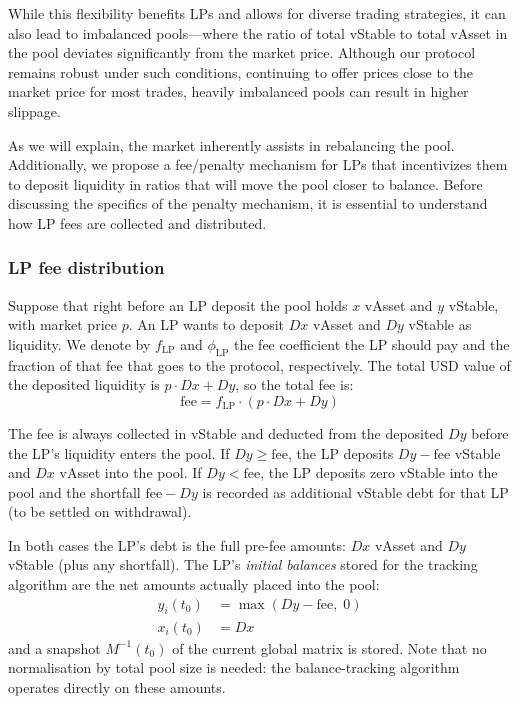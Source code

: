 \documentclass{article}
\begin{document}
While this flexibility benefits LPs and allows for diverse trading strategies, it can also
lead to imbalanced pools---where the ratio of total vStable to total vAsset in the pool
deviates significantly from the market price. Although our protocol remains robust under
such conditions, continuing to offer prices close to the market price for most trades,
heavily imbalanced pools can result in higher slippage.

As we will explain, the market inherently assists in rebalancing the pool. Additionally, we
propose a fee/penalty mechanism for LPs that incentivizes them to deposit liquidity in
ratios that will move the pool closer to balance. Before discussing the specifics of the
penalty mechanism, it is essential to understand how LP fees are collected and distributed.

\subsubsection{LP fee distribution}

Suppose that right before an LP deposit the pool holds $x$ vAsset and $y$ vStable, with
market price $p$. An LP wants to deposit $Dx$ vAsset and $Dy$ vStable as liquidity. We
denote by $f_{\mathrm{LP}}$ and $\phi_{\mathrm{LP}}$ the fee coefficient the LP should pay
and the fraction of that fee that goes to the protocol, respectively. The total USD value of
the deposited liquidity is $p \cdot Dx + Dy$, so the total fee is:
\begin{equation}
\mathrm{fee} = f_{\mathrm{LP}} \cdot (p \cdot Dx + Dy)
\end{equation}

The fee is always collected in vStable and deducted from the deposited $Dy$ before the
LP's liquidity enters the pool. If $Dy \geq \mathrm{fee}$, the LP deposits
$Dy - \mathrm{fee}$ vStable and $Dx$ vAsset into the pool. If $Dy < \mathrm{fee}$, the
LP deposits zero vStable into the pool and the shortfall $\mathrm{fee} - Dy$ is recorded
as additional vStable debt for that LP (to be settled on withdrawal).

In both cases the LP's debt is the full pre-fee amounts: $Dx$ vAsset and $Dy$ vStable
(plus any shortfall). The LP's \emph{initial balances} stored for the tracking algorithm
are the net amounts actually placed into the pool:
\begin{align}
y_i(t_0) &= \max(Dy - \mathrm{fee},\; 0) \\
x_i(t_0) &= Dx
\end{align}
and a snapshot $M^{-1}(t_0)$ of the current global matrix is stored. Note that no
normalisation by total pool size is needed: the balance-tracking algorithm operates
directly on these amounts.
\end{document}
